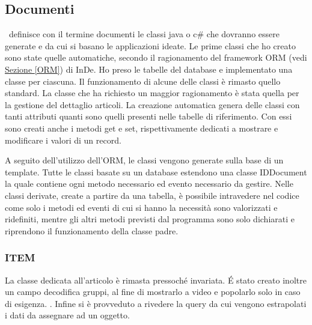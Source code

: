 \subsection{Documenti}
\inde\ definisce con il termine documenti le classi java o c\# che dovranno essere generate e da cui si basano le applicazioni ideate.
Le prime classi che ho creato sono state quelle automatiche, secondo il ragionamento del framework ORM (vedi \hyperref[ORM]{Sezione \ref{ORM}}) di InDe. Ho preso le tabelle del database e implementato una classe per ciascuna. Il funzionamento di alcune delle classi è rimasto quello standard. La classe che ha richiesto un  maggior ragionamento è stata quella per la gestione del dettaglio articoli.
La creazione automatica genera delle classi con tanti attributi quanti sono quelli presenti nelle tabelle di riferimento. Con essi sono creati anche i metodi get e set, rispettivamente dedicati a mostrare e modificare i valori di un record.

A seguito dell'utilizzo dell'ORM, le classi vengono generate sulla base di un template. Tutte le classi basate su un database estendono una classe IDDocument la quale contiene ogni metodo necessario ed evento necessario da gestire. Nelle classi derivate, create a partire da una tabella, è possibile intravedere nel codice come solo i metodi ed eventi di cui si hanno la necessità sono valorizzati e ridefiniti, mentre gli altri metodi previsti dal programma sono solo dichiarati e riprendono il funzionamento della classe padre.


\subsubsection{ITEM}
La classe dedicata all'articolo è rimasta pressoché invariata. \'E stato creato inoltre un campo decodifica gruppi, al fine di mostrarlo a video e popolarlo solo in caso di esigenza. . Infine si è provveduto a rivedere la query da cui vengono estrapolati i dati da assegnare ad un oggetto.

